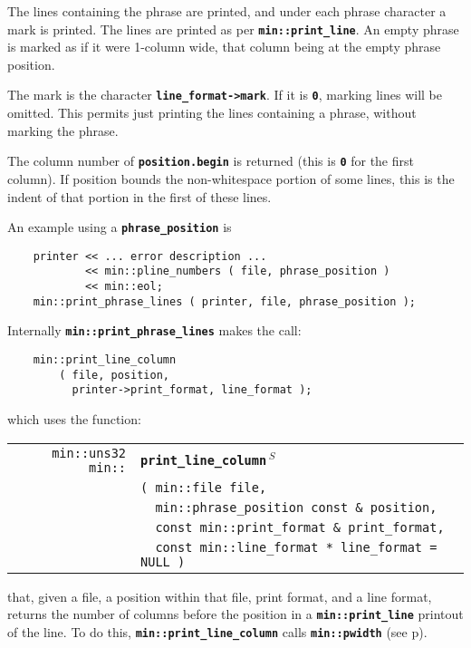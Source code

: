 \documentclass[12pt]{article}
\makeatletter
\newcommand{\TT}[1]{{\tt \bfseries #1}}
\newcommand{\ttindex}[1]{\index{#1@{\tt #1}}}
\newcommand{\pagref}[1]{p\pageref{#1}}
\newcommand{\EOL}{\penalty \exhyphenpenalty}
\newenvironment{indpar}[1][0.3in]%
	{\begin{list}{}%
		     {\setlength{\itemsep}{0in}%
		      \setlength{\topsep}{0in}%
		      \setlength{\parsep}{1ex}%
		      \setlength{\labelwidth}{#1}%
		      \setlength{\leftmargin}{#1}%
		      \addtolength{\leftmargin}{\labelsep}}%
	 \item}%
	{\end{list}}
\newcommand{\LABEL}[1]{\label{#1}}
\newlength{\ARGBREAKLENGTH}
\newcommand{\ARGBREAK}[1][\ARGBREAKLENGTH]{\\&\hspace*{#1}}
\newcommand{\MINKEY}[1]%
	   {\TT{#1}\ttindex{min::#1}\ttindex{#1}}
\newcommand{\RESIZE}{$\,^S$}
\makeatother
\begin{document}
The lines containing the phrase are printed, and under each phrase
character a mark is printed.
The lines are printed
as per \TT{min::\EOL print\_\EOL line}.
An empty phrase is marked as if it were 1-column wide, that column
being at the empty phrase position.

The mark is the character \TT{line\_\EOL format->mark}.
If it is \TT{0}, marking lines will be omitted.
This permits just printing the lines containing
a phrase, without marking the phrase.

The column number of \TT{position.begin} is returned (this is \TT{0}
for the first column).  If position bounds the non-whitespace
portion of some lines, this is the indent of that portion in
the first of these lines.

An example using a \TT{phrase\_position} is

\begin{indpar}\begin{verbatim}
    printer << ... error description ...
            << min::pline_numbers ( file, phrase_position )
            << min::eol;
    min::print_phrase_lines ( printer, file, phrase_position );
\end{verbatim}\end{indpar}

Internally \TT{min::\EOL print\_\EOL phrase\_\EOL lines}
makes the call:

\begin{indpar}\begin{verbatim}
    min::print_line_column
        ( file, position,
          printer->print_format, line_format );
\end{verbatim}\end{indpar}

which uses the function:

\begin{indpar}[1em]\begin{tabular}{r@{}l}
\verb|min::uns32 min::|
    & \MINKEY{print\_\EOL line\_\EOL column\RESIZE}\ARGBREAK
      \verb|( min::file file,|\ARGBREAK
      \verb|  min::phrase_position const & position,|\ARGBREAK
      \verb|  const min::print_format & print_format,|\ARGBREAK
      \verb|  const min::line_format * line_format = NULL )|
\LABEL{MIN::PRINT_LINE_COLUMN} \\
\end{tabular}\end{indpar}

that, given a file, a position within that file, print format,
and a line format, returns the number of
columns before the position in a \TT{min::\EOL print\_\EOL line}
printout of the line.  To do this, \TT{min::\EOL print\_\EOL line\_\EOL column}
calls \TT{min::\EOL pwidth} (see \pagref{MIN::PWIDTH_OF_STRING}).
\end{document}
